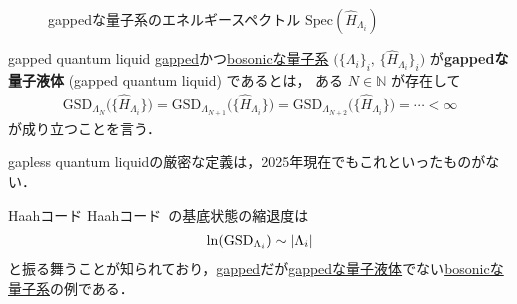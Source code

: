 \documentclass[TQFT_main]{subfiles}
\begin{document}
\begin{figure}[H]
    \centering
    \caption{gappedな量子系のエネルギースペクトル $\mathrm{Spec}(\hat{H}_{\Lambda_i})$}
    \label{fig:gapped}
\end{figure}%


\begin{mydefph}[label=def:gappedQL]{gapped quantum liquid}
    \hyperref[def:gapped]{gapped}かつ\hyperref[def:bosonic-lattice-model]{bosonicな量子系} $\bigl( \{\Lambda_i\}_i,\, \{\hat{H}_{\Lambda_i}\}_i \bigr)$ が\textbf{gappedな量子液体} (gapped quantum liquid) であるとは，
    ある $N \in \mathbb{N}$ が存在して
    \begin{align}
        \mathrm{GSD}_{\Lambda_{N}}\bigl( \{\hat{H}_{\Lambda_i}\} \bigr) = \mathrm{GSD}_{\Lambda_{N+1}}\bigl( \{\hat{H}_{\Lambda_i}\} \bigr) = \mathrm{GSD}_{\Lambda_{N+2}}\bigl( \{\hat{H}_{\Lambda_i}\} \bigr) = \cdots < \infty
    \end{align}
    が成り立つことを言う．
\end{mydefph}

\begin{marker}
    gapless quantum liquidの厳密な定義は，2025年現在でもこれといったものがない．
\end{marker}

\begin{myexample}[label=ex:Haah]{Haahコード}
    Haahコード~\cite{Haah2011}の基底状態の縮退度は
    \begin{align}
        \ln(\mathrm{GSD}_{\Lambda_i}) \sim \abs{\Lambda_i}
    \end{align}
    と振る舞うことが知られており，\hyperref[def:gapped]{gapped}だが\hyperref[def:gappedQL]{gappedな量子液体}でない\hyperref[def:bosonic-lattice-model]{bosonicな量子系}の例である．
\end{myexample}
\end{document}
